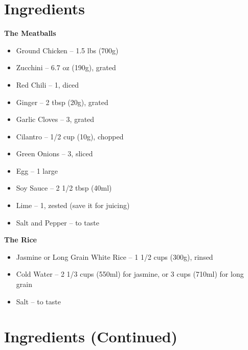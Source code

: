 




\section*{Ingredients}

\textbf{The Meatballs}
\begin{itemize}[itemsep=0.1em, label={\raisebox{-0.1ex}{\large\textbullet}}]
      \item Ground Chicken – 1.5 lbs (700g)
      \item[\cut] Zucchini – 6.7 oz (190g), grated
      \item[\cut] Red Chili – 1, diced
      \item[\cut] Ginger – 2 tbsp (20g), grated
      \item[\cut] Garlic Cloves – 3, grated
      \item[\cut] Cilantro – 1/2 cup (10g), chopped
      \item[\cut] Green Onions – 3, sliced
      \item Egg – 1 large
      \item[\measure] Soy Sauce – 2 1/2 tbsp (40ml)
      \item[\cut] Lime – 1, zested (save it for juicing)
      \item Salt and Pepper – to taste
\end{itemize}

\textbf{The Rice}
\begin{itemize}[itemsep=0.1em, label={\raisebox{-0.1ex}{\large\textbullet}}]
      \item Jasmine or Long Grain White Rice – 1 1/2 cups (300g), rinsed
      \item[\measure] Cold Water – 2 1/3 cups (550ml) for jasmine, or 3 cups (710ml) for long grain
      \item Salt – to taste
\end{itemize}

\newpage
{}
\section*{Ingredients (Continued)}

